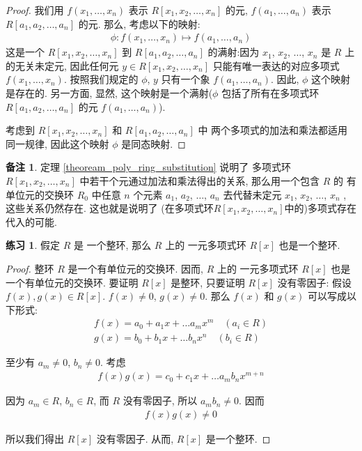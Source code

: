\documentclass[utf8]{ctexbook}
\theoremstyle{definition}
\newtheorem{memo}{备注}[section]
\newtheorem{exercise}{练习}[section]
\begin{document}
\begin{proof}
我们用 $f(x_1, \ldots , x_n)$ 表示 $R[x_1, x_2, \ldots, x_{n} ]$ 的元, $f(a_1, \ldots , a_n)$ 表示 $R[a_1, a_2, \ldots, a_{n} ]$ 的元. 那么, 考虑以下的映射:
\begin{align*}
\phi: f(x_1, \ldots , x_n) \mapsto f(a_1, \ldots , a_n)
\end{align*}
这是一个 $R[x_1, x_2, \ldots, x_{n} ]$ 到 $R[a_1, a_2, \ldots, a_{n} ]$ 的满射:因为 $x_1$, $x_2$, $\ldots$, $x_n$ 是 $R$ 上的无关未定元, 因此任何元 $y \in R[x_1, x_2, \ldots, x_{n} ] $ 只能有唯一表达的对应多项式 $f(x_1, \ldots, x_n)$. 按照我们规定的 $\phi$, $y$ 只有一个象 $f(a_1, \ldots, a_n)$. 因此, $\phi$ 这个映射是存在的. 另一方面, 显然, 这个映射是一个满射($\phi$ 包括了所有在多项式环 $R[a_1, a_2, \ldots, a_{n} ]$ 的元 $f(a_1, \ldots, a_n)$).

考虑到 $R[x_1, x_2, \ldots, x_{n} ]$ 和 $R[a_1, a_2, \ldots, a_{n} ]$ 中 两个多项式的加法和乘法都适用同一规律, 因此这个映射 $\phi$ 是同态映射.

\end{proof}

\begin{memo}
定理 \ref{theoream_poly_ring_substitution} 说明了 多项式环 $R[x_1, x_2, \ldots, x_{n} ]$ 中若干个元通过加法和乘法得出的关系, 那么用一个包含 $R$ 的 有单位元的交换环 $R_0$ 中任意 $n$ 个元素 $a_1$, $a_2$, $\ldots$, $a_n$ 去代替未定元 $x_1$, $x_2$, $\ldots$, $x_n$ , 这些关系仍然存在. 这也就是说明了 (在多项式环$R[x_1, x_2, \ldots, x_{n} ]$中的)多项式存在 代入的可能. 
\end{memo}

\begin{exercise}
假定 $R$ 是 一个整环, 那么 $R$ 上的 一元多项式环 $R[x]$ 也是一个整环.
\end{exercise}

\begin{proof}
整环 $R$ 是一个有单位元的交换环. 因而, $R$ 上的 一元多项式环 $R[x]$ 也是一个有单位元的交换环. 要证明 $R[x]$ 是整环, 只要证明 $R[x]$ 没有零因子:
假设 $f(x) , g(x) \in R[x]$. $f(x) \neq 0$, $g(x) \neq 0$. 那么 $f(x)$ 和 $g(x)$ 可以写成以下形式:
\begin{align*}
f(x) = a_0 + a_1 x + \ldots a_m x^m \quad (a_i \in R) \\
g(x) = b_0 + b_1 x + \ldots b_n x^n \quad (b_i \in R)
\end{align*}

至少有 $a_m \neq 0$, $b_n \neq 0$.  考虑
\begin{align*}
f(x) g(x) = c_0 + c_1 x + \ldots a_m b_n x^{m+n} 
\end{align*}

因为 $a_m \in R$, $b_n \in R$, 而 $R$ 没有零因子, 所以 $a_m b_n \neq 0 $. 因而 
\begin{align*}
f(x) g(x) \neq 0
\end{align*} 

所以我们得出 $R[x]$ 没有零因子. 从而,  $R[x]$ 是一个整环.

\end{proof}
\end{document}
